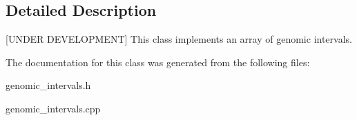 \subsection{Detailed Description}
\mbox{[}UNDER DEVELOPMENT\mbox{]} This class implements an array of genomic intervals. 

The documentation for this class was generated from the following files:\begin{DoxyCompactItemize}
\item 
genomic\_\-intervals.h\item 
genomic\_\-intervals.cpp\end{DoxyCompactItemize}
